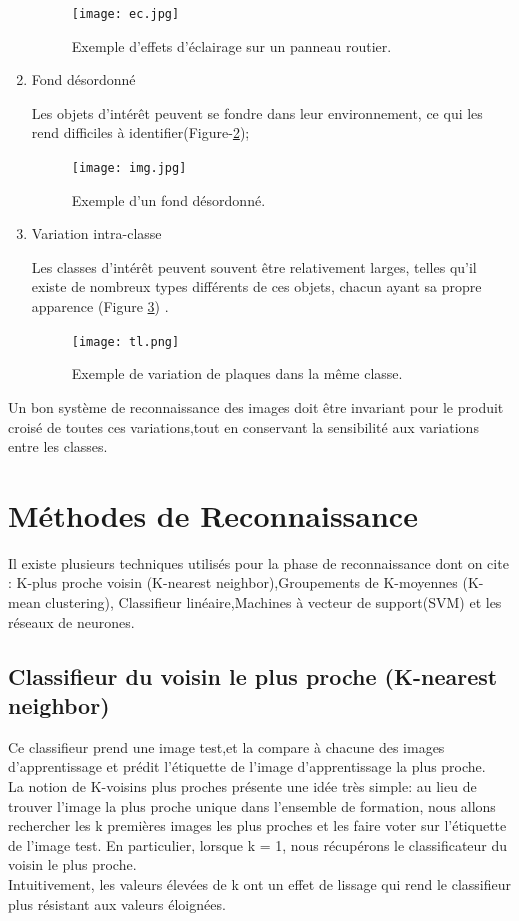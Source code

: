 \begin{enumerate}
\begin{figure}[h]
      \centering
      \texttt{[image: ec.jpg]}
    \caption{Exemple d'effets d'éclairage sur un panneau routier.}
    \label{fig:conditions}
\end{figure}
\item \begin{flushleft} Fond désordonné\end{flushleft} Les objets d'intérêt peuvent se fondre dans leur environnement, ce qui les rend difficiles à identifier(Figure-\ref{fig:fond});
\begin{figure}[h!]
      \centering
      \texttt{[image: img.jpg]}
    \caption{Exemple d'un fond désordonné.}
    \label{fig:fond}
\end{figure}
\pagebreak
\item  \begin{flushleft} Variation intra-classe \end{flushleft}
Les classes d'intérêt peuvent souvent être relativement larges, telles qu’il existe de nombreux types différents de ces objets, chacun ayant sa propre apparence (Figure \ref{fig:intraclasse}) .

\begin{figure}[h!]
      \centering
      \texttt{[image: tl.png]}
    \caption{Exemple de variation de plaques dans la même classe.}
    \label{fig:intraclasse}
\end{figure}
\end{enumerate}

Un bon système de reconnaissance des images doit être invariant pour le produit croisé de toutes ces variations,tout en conservant la sensibilité aux variations entre les classes.

\section{Méthodes de Reconnaissance }

Il existe plusieurs techniques utilisés pour la phase de reconnaissance dont on cite : K-plus proche voisin (K-nearest neighbor),Groupements de K-moyennes (K-mean clustering), Classifieur linéaire,Machines à vecteur de support(SVM) et les réseaux de neurones.

\subsection{Classifieur du voisin le plus proche (K-nearest neighbor) }

Ce classifieur prend une image test,et la compare à chacune des images d'apprentissage et prédit l'étiquette de l'image d'apprentissage la plus proche.\\
La notion de K-voisins plus proches présente une idée très simple: au lieu de trouver l'image la plus proche unique dans l'ensemble de formation, nous allons rechercher les k premières images les plus proches et les faire voter sur l'étiquette de l'image test. En particulier, lorsque k = 1, nous récupérons le classificateur  du voisin le plus proche.\\ Intuitivement, les valeurs élevées de k ont un effet de lissage qui rend le classifieur plus résistant aux valeurs éloignées.

